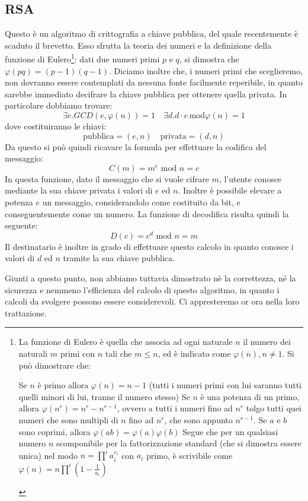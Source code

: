 \subsection{RSA}
Questo è un algoritmo di crittografia a chiave pubblica, del quale recentemente
è scaduto il brevetto. Esso sfrutta la teoria dei numeri e la definizione
della funzione di Eulero\footnote{La funzione di Eulero è quella che associa
ad ogni naturale $n$ il numero dei naturali $m$ primi con $n$ tali che $m\leq n$,
ed è indicato come $\varphi(n),n\neq 1$. Si può dimostrare che:
\begin{itemize}
\diam Se $n$ è primo allora $\varphi(n)=n-1$ (tutti i numeri primi con lui
	saranno tutti quelli minori di lui, tranne il numero stesso)
\diam Se $n$ è una potenza di un primo, allora $\varphi(n^r)=n^r-n^{r-1}$, ovvero
	a tutti i numeri fino ad $n^r$ tolgo tutti quei numeri che sono multipli
	di $n$ fino ad $n^r$, che sono appunto $n^{r-1}$.
\diam Se $a$ e $b$ sono coprimi, allora $\varphi(ab)=\varphi(a)\varphi(b)$
\diam Segue che per un qualsiasi numero $n$ scomponibile per la fattorizzazione
	standard (che si dimostra essere unica) nel modo $n=\prod^i a_i^{e_i}$
	con $a_i$ primo, è scrivibile come $\varphi(n)=n\prod^i\left(1-\frac{1}{a_i}\right)$
\end{itemize}
}: dati due numeri primi $p$ e $q$, si dimostra che $\varphi(pq)=(p-1)(q-1)$.
Diciamo inoltre che, i numeri primi che sceglieremo, non dovranno essere 
contemplati da nessuna fonte facilmente reperibile, in quanto sarebbe immediato
decifrare la chiave pubblica per ottenere quella privata. In particolare
dobbiamo trovare:
\[\exists e. GCD(e,\varphi(n))=1\quad \exists d.d\cdot e\,\textrm{mod}\varphi(n)=1\]
dove costituiranno le chiavi:
\[\textrm{pubblica} = (e,n)\quad\textrm{privata} = (d,n)\]
Da questo si può quindi ricavare la formula per effettuare la codifica del 
messaggio:
\[C(m)=m^e\text{ mod }n = c\]
In questa funzione, dato il messaggio che si vuole cifrare $m$, l'utente 
conosce mediante la sua chiave privata i valori di $e$ ed $n$. Inoltre è 
possibile elevare a potenza $e$ un messaggio, considerandolo come costituito
da bit, e conseguentemente come un numero. La funzione di decodifica risulta
quindi la seguente:
\[D(c)=c^d\text{ mod } n = m\]
Il destinatario è inoltre in grado di effettuare questo calcolo in quanto 
conosce i valori di $d$ ed $n$ tramite la sua chiave pubblica. 

Giunti a questo punto, non abbiamo tuttavia dimostrato nè la correttezza, né la
sicurezza e nemmeno l'efficienza del calcolo di questo algoritmo, in quanto i 
calcoli da svolgere possono essere considerevoli. Ci appresteremo
or ora nella loro trattazione.

